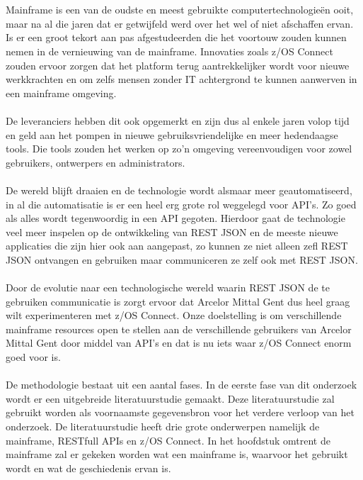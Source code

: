 

\chapter*{}
Mainframe is een van de oudste en meest gebruikte computertechnologieën ooit, maar na al die jaren dat er getwijfeld werd over het wel of niet afschaffen ervan. Is er een groot tekort aan pas afgestudeerden die het voortouw zouden kunnen nemen in de vernieuwing van de mainframe. Innovaties zoals z/OS Connect zouden ervoor zorgen dat het platform terug aantrekkelijker wordt voor nieuwe werkkrachten en om zelfs mensen zonder IT achtergrond te kunnen aanwerven in een mainframe omgeving.
\\ \\
De leveranciers hebben dit ook opgemerkt en zijn dus al enkele jaren volop tijd en geld aan het pompen in nieuwe gebruiksvriendelijke en meer hedendaagse tools. Die tools zouden het werken op zo'n omgeving vereenvoudigen voor zowel gebruikers, ontwerpers en administrators.
\\ \\
De wereld blijft draaien en de technologie wordt alsmaar meer geautomatiseerd, in al die automatisatie is er een heel erg grote rol weggelegd voor API's. Zo goed als alles wordt tegenwoordig in een API gegoten. Hierdoor gaat de technologie veel meer inspelen op de ontwikkeling van REST JSON en de meeste nieuwe applicaties die zijn hier ook aan aangepast, zo kunnen ze niet alleen zefl REST JSON ontvangen en gebruiken maar communiceren ze zelf ook met REST JSON.
\\ \\
Door de evolutie naar een technologische wereld waarin REST JSON de te gebruiken communicatie is zorgt ervoor dat Arcelor Mittal Gent dus heel graag wilt experimenteren met z/OS Connect. Onze doelstelling is om verschillende mainframe resources open te stellen aan de verschillende gebruikers van Arcelor Mittal Gent door middel van API's en dat is nu iets waar z/OS Connect enorm goed voor is.
\\ \\
De methodologie bestaat uit een aantal fases. In de eerste fase van dit onderzoek wordt er een uitgebreide literatuurstudie gemaakt. Deze literatuurstudie zal gebruikt worden als voornaamste gegevensbron voor het verdere verloop van het onderzoek. De literatuurstudie heeft drie grote onderwerpen namelijk de mainframe, RESTfull APIs en z/OS Connect. In het hoofdstuk omtrent de mainframe zal er gekeken worden wat een mainframe is, waarvoor het gebruikt wordt en wat de geschiedenis ervan is.
